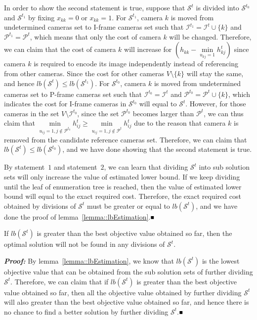 In order to show the second statement is true, suppose that $\mathcal{S}^t$ is divided into $\mathcal{S}^{t_0}$ and $\mathcal{S}^{t_1}$ by fixing $x_{kk}=0$ or $x_{kk}=1$.
For $\mathcal{S}^{t_1}$, camera $k$ is moved from undetermined cameras set to I-frame cameras set such that $\mathcal{I}^{t_1} = \mathcal{I}^t \cup \{k\}$ and $\mathcal{P}^{t_1} = \mathcal{P}^t$, which means that only the cost of camera $k$ will be changed.
Therefore, we can claim that the cost of camera $k$ will increase for $\left( h_{kk} - \underset{u_{kj}=1}{\min} h_{kj}^t \right)$ since camera $k$ is required to encode its image independently instead of referencing from other cameras.
Since the cost for other cameras $V\setminus \{k\}$ will stay the same, and hence $lb(\mathcal{S}^t) \leq lb(\mathcal{S}^{t_1})$.
For $\mathcal{S}^{t_0}$, camera $k$ is moved from undetermined cameras set to P-frame cameras set such that $\mathcal{I}^{t_0} = \mathcal{I}^t$ and $\mathcal{P}^{t_0} = \mathcal{P}^t \cup \{k\}$, which indicates the cost for I-frame cameras in $\mathcal{S}^{t_0}$ will equal to $\mathcal{S}^t$.
However, for those cameras in the set $V \setminus \mathcal{I}^{t_0}$, since the set $\mathcal{P}^{t_0}$ becomes larger than $\mathcal{P}^t$, we can thus claim that $\underset{u_{ij}=1, j \notin \mathcal{P}^{t_0}}{\min} h_{ij}^t \geq \underset{u_{ij}=1, j \notin \mathcal{P}^{t}}{\min} h_{ij}^t$ due to the reason that camera $k$ is removed from the candidate reference cameras set.
Therefore, we can claim that $lb(\mathcal{S}^t) \leq lb(\mathcal{S}^{t_0})$, and we have done showing that the second statement is true.

By statement~$1$ and statement~$2$, we can learn that dividing $\mathcal{S}^t$ into sub solution sets will only increase the value of estimated lower bound.
If we keep dividing until the leaf of enumeration tree is reached, then the value of estimated lower bound will equal to the exact required cost.
Therefore, the exact required cost obtained by divisions of $\mathcal{S}^t$ must be greater or equal to $lb(\mathcal{S}^t)$, and we have done the proof of lemma~\ref{lemma::lbEstimation}.\hfill$\mathsmaller{\mathsmaller{\blacksquare}}$

\begin{mythm}
If $lb(\mathcal{S}^t)$ is greater than the best objective value obtained so far, then the optimal solution will not be found in any divisions of $\mathcal{S}^t$.
\label{theorem::bound}
\end{mythm}
\textbf{\emph{Proof:}}
By lemma~\ref{lemma::lbEstimation}, we know that $lb(\mathcal{S}^t)$ is the lowest objective value that can be obtained from the sub solution sets of further dividing $\mathcal{S}^t$.
Therefore, we can claim that if $lb(\mathcal{S}^t)$ is greater than the best objective value obtained so far, then all the objective value obtained by further dividing $\mathcal{S}^t$ will also greater than the best objective value obtained so far, and hence there is no chance to find a better solution by further dividing $\mathcal{S}^t$.\hfill$\mathsmaller{\mathsmaller{\blacksquare}}$

